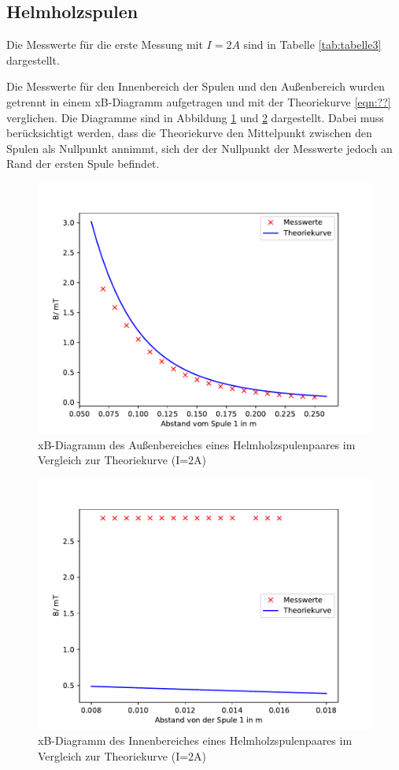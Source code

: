 \subsection{Helmholzspulen}
Die Messwerte für die erste Messung mit $I=2A$ sind in
Tabelle \ref{tab:tabelle3} dargestellt.

Die Messwerte für den Innenbereich der Spulen und den
Außenbereich wurden getrennt in einem xB-Diagramm
aufgetragen und mit der Theoriekurve \ref{eqn:??}
verglichen. Die Diagramme sind in Abbildung
\ref{fig:Helmholz1} und \ref{fig:Helmholz1I}
dargestellt. Dabei muss berücksichtigt werden, dass die
Theoriekurve den Mittelpunkt zwischen den Spulen als
Nullpunkt annimmt, sich der der Nullpunkt der
Messwerte jedoch an Rand der ersten Spule befindet.
\begin{figure}[H]
  \centering
  \includegraphics{Helmholz1.pdf}
  \caption{xB-Diagramm des Außenbereiches eines
  Helmholzspulenpaares im Vergleich zur Theoriekurve
  (I=2A)}
  \label{fig:Helmholz1}
\end{figure}
\begin{figure}[H]
  \centering
  \includegraphics{Helmholz1I.pdf}
  \caption{xB-Diagramm des Innenbereiches eines
  Helmholzspulenpaares im Vergleich zur Theoriekurve
  (I=2A)}
  \label{fig:Helmholz1I}
\end{figure}

